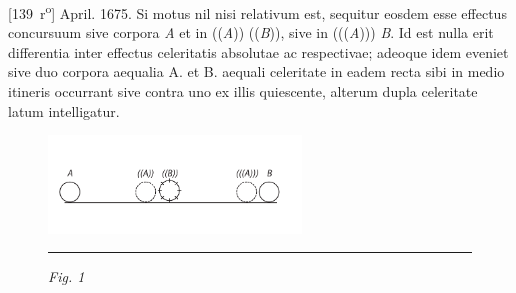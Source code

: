 \vspace*{8mm}
\pstart 
\noindent
\normalsize
[139~r\textsuperscript{o}] April. 1675.\pend \pstart \noindent
Si motus\protect{} nil nisi relativum est, sequitur eosdem esse effectus\protect{} concursuum\protect{} sive corpora\protect{} \textit{A} et  in ((\textit{A})) ((\textit{B})), sive in (((\textit{A}))) \textit{B}. Id est nulla erit differentia inter effectus celeritatis absolutae\protect{} ac respectivae\protect{}; adeoque idem eveniet sive duo corpora  aequalia A. et B. aequali celeritate in eadem recta sibi in medio itineris occurrant sive contra uno ex illis quiescente, alterum dupla celeritate latum intelligatur.
\begin{figure} 
\includegraphics[width=0.6\textwidth]{images/lh03705139r}\\
\rule[0cm]{40mm}{0cm}\textit{Fig. 1}
\end{figure}
